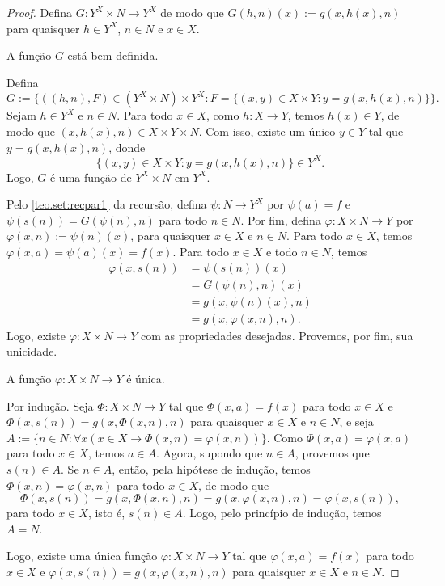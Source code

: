 \begin{proof} 
    Defina $G : Y^X \times N \to Y^X$ de modo que $G(h,n)(x) := g(x,h(x),n)$ para quaisquer $h \in Y^X$, $n \in N$ e $x \in X$.
        \begin{claim}
            A função $G$ está bem definida.
        \end{claim}
        \begin{midproof}
            Defina
                \[
                    G := \{((h,n),F) \in (Y^X \times N) \times Y^X : F = \{(x,y)\in X\times Y : y=g(x,h(x),n)\}\}.
                \]
            Sejam $h \in Y^X$ e $n \in N$. Para todo $x \in X$, como $h: X \to Y$, temos $h(x) \in Y$, de modo que $(x,h(x),n) \in X \times Y \times N$. Com isso, existe um único $y \in Y$ tal que $y = g(x,h(x),n)$, donde
                \[
                    \{(x,y)\in X\times Y : y=g(x,h(x),n)\} \in Y^X.
                \]
            Logo, $G$ é uma função de $Y^X \times N$ em $Y^X$. \whiteproof
        \end{midproof}
    Pelo \cref{teo.set:recpar1} da recursão, defina $\psi : N \to Y^X$ por $\psi(a) = f$ e $\psi(s(n)) = G(\psi(n),n)$ para todo $n \in N$. Por fim, defina $\varphi : X \times N \to Y$ por $\varphi(x,n) := \psi(n)(x)$, para quaisquer $x \in X$ e $n \in N$. Para todo $x \in X$, temos $\varphi(x,a) = \psi(a)(x) = f(x)$. Para todo $x \in X$ e todo $n \in N$, temos
        \begin{align*}
            \varphi(x,s(n)) &= \psi(s(n))(x) \\
            &= G(\psi(n),n)(x) \\
            &= g(x, \psi(n)(x), n) \\
            &= g(x, \varphi(x,n), n).
        \end{align*}
    Logo, existe $\varphi : X \times N \to Y$ com as propriedades desejadas. Provemos, por fim, sua unicidade.
        \begin{claim}
            A função $\varphi : X \times N \to Y$ é única.
        \end{claim}
        \begin{midproof}
            Por indução. Seja $\Phi : X \times N \to Y$ tal que $\Phi(x,a) = f(x)$ para todo $x \in X$ e $\Phi(x,s(n)) = g(x,\Phi(x,n), n)$ para quaisquer $x \in X$ e $n \in N$, e seja $A := \{ n \in N : \forall x (x \in X \rightarrow \Phi(x,n) = \varphi(x,n))\}$. Como $\Phi(x,a) = \varphi(x,a)$ para todo $x \in X$, temos $a \in A$. Agora, supondo que $n \in A$, provemos que $s(n) \in A$. Se $n \in A$, então, pela hipótese de indução, temos $\Phi(x,n) = \varphi(x,n)$ para todo $x \in X$, de modo que
                \[
                    \Phi(x,s(n)) = g(x,\Phi(x,n), n) = g(x,\varphi(x,n), n) = \varphi(x,s(n)),
                \]
            para todo $x \in X$, isto é, $s(n) \in A$. Logo, pelo princípio de indução, temos $A = N$. \whiteproof
        \end{midproof}
    Logo, existe uma única função $\varphi: X \times N \to Y$ tal que $\varphi(x,a) = f(x)$ para todo $x \in X$ e $\varphi(x,s(n)) = g(x,\varphi(x,n), n)$ para quaisquer $x \in X$ e $n \in N$. \blackproof
\end{proof}

